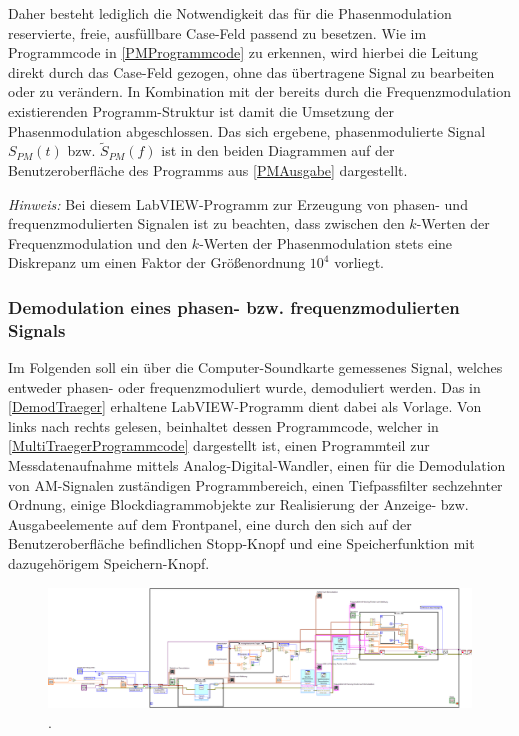 \documentclass[
a4paper,
12pt,
pagesize,
ngerman
]{scrartcl}
\begin{document}
	\noindent Daher besteht lediglich die Notwendigkeit das für die Phasenmodulation reservierte, freie, ausfüllbare Case-Feld passend zu besetzen. 
	Wie im Programmcode in \cref{PMProgrammcode} zu erkennen, wird hierbei die Leitung direkt durch das Case-Feld gezogen, ohne das übertragene Signal zu bearbeiten oder zu verändern. 
	In Kombination mit der bereits durch die Frequenzmodulation existierenden Programm-Struktur ist damit die Umsetzung der Phasenmodulation abgeschlossen. 
	Das sich ergebene, phasenmodulierte Signal $S_{PM}(t)$ bzw. $\tilde{S}_{PM}(f)$ ist in den beiden Diagrammen auf der Benutzeroberfläche des Programms aus \cref{PMAusgabe} dargestellt.
	
	\emph{Hinweis:} Bei diesem LabVIEW-Programm zur Erzeugung von phasen- und frequenzmodulierten Signalen ist zu beachten, dass zwischen den $k$-Werten der Frequenzmodulation und den $k$-Werten der Phasenmodulation stets eine Diskrepanz um einen Faktor der Größenordnung $10^4$ vorliegt.
	
	
	
	\subsubsection{Demodulation eines phasen- bzw. frequenzmodulierten Signals}
	
	Im Folgenden soll ein über die Computer-Soundkarte gemessenes Signal, welches entweder phasen- oder frequenzmoduliert wurde, demoduliert werden. 
	Das in \cref{DemodTraeger} erhaltene LabVIEW-Programm dient dabei als Vorlage. 
	Von links nach rechts gelesen, beinhaltet dessen Programmcode, welcher in \cref{MultiTraegerProgrammcode} dargestellt ist, einen Programmteil zur Messdatenaufnahme mittels Analog-Digital-Wandler, einen für die Demodulation von AM-Signalen zuständigen Programmbereich, einen Tiefpassfilter sechzehnter Ordnung, einige Blockdiagrammobjekte zur Realisierung der Anzeige- bzw. Ausgabeelemente auf dem Frontpanel, eine durch den sich auf der Benutzeroberfläche befindlichen \glqq Stopp\grqq -Knopf und eine Speicherfunktion mit dazugehörigem \glqq Speichern\grqq -Knopf.
	
	\begin{figure}[H]
		\centering
		\includegraphics[width=1.0\textwidth]{EIRE2018Dateien/Tag4/OsziFMPM-Demod/FM/OsziPlusFMPMd}
		\caption{.}
	\end{figure}
	
\end{document}
